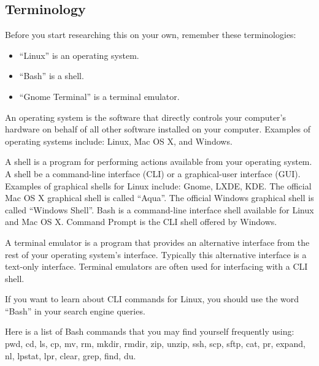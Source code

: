 \documentclass[a4paper,12pt]{article}
\begin{document}
\subsection*{Terminology}

Before you start researching this on your own, remember these terminologies:
\begin{itemize}
\item ``Linux'' is an operating system. 
\item ``Bash'' is a shell. 
\item ``Gnome Terminal'' is a terminal emulator.
\end{itemize}

An operating system is the software that directly controls your computer's hardware on behalf of all other software installed on your computer. Examples of operating systems include: Linux, Mac OS X, and Windows. 

A shell is a program for performing actions available from your operating system. A shell be a command-line interface (CLI) or a graphical-user interface (GUI). Examples of graphical shells for Linux include: Gnome, LXDE, KDE. The official Mac OS X graphical shell is called ``Aqua''. The official Windows graphical shell is called ``Windows Shell''. Bash is a command-line interface shell available for Linux and Mac OS X. Command Prompt is the CLI shell offered by Windows. 

A terminal emulator is a program that provides an alternative interface from the rest of your operating system's interface. Typically this alternative interface is a text-only interface. Terminal emulators are often used for interfacing with a CLI shell. 

If you want to learn about CLI commands for Linux, you should use the word ``Bash'' in your search engine queries. 

Here is a list of Bash commands that you may find yourself frequently using: pwd, cd, ls, cp, mv, rm, mkdir, rmdir, zip, unzip, ssh, scp, sftp, cat, pr, expand, nl, lpstat, lpr, clear, grep, find, du.
\end{document}
